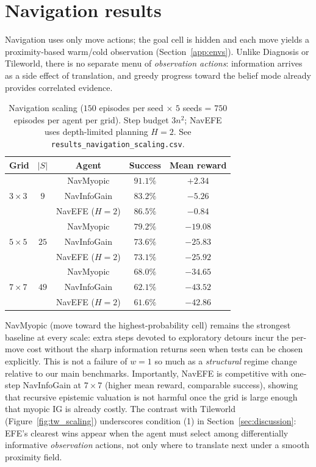 \documentclass[runningheads]{llncs}
\begin{document}
\section{Navigation results}
\label{app:navigation}

Navigation uses only move actions; the goal cell is hidden and each move yields a proximity-based warm/cold observation (Section~\ref{app:envs}). Unlike Diagnosis or Tileworld, there is no separate menu of \emph{observation actions}: information arrives as a side effect of translation, and greedy progress toward the belief mode already provides correlated evidence.

\begin{table}[h]
\centering
\caption{Navigation scaling ($150$ episodes per seed $\times$ $5$ seeds = $750$ episodes per agent per grid). Step budget $3n^2$; NavEFE uses depth-limited planning $H{=}2$. See \texttt{results\_navigation\_scaling.csv}.}
\label{tab:nav_scaling}
\begin{small}
\begin{tabular}{lcccc}
\toprule
Grid & $|S|$ & Agent & Success & Mean reward \\
\midrule
\multirow{3}{*}{$3{\times}3$} & \multirow{3}{*}{$9$} & NavMyopic & $91.1\%$ & $+2.34$ \\
& & NavInfoGain & $83.2\%$ & $-5.26$ \\
& & NavEFE ($H{=}2$) & $86.5\%$ & $-0.84$ \\
\midrule
\multirow{3}{*}{$5{\times}5$} & \multirow{3}{*}{$25$} & NavMyopic & $79.2\%$ & $-19.08$ \\
& & NavInfoGain & $73.6\%$ & $-25.83$ \\
& & NavEFE ($H{=}2$) & $73.1\%$ & $-25.92$ \\
\midrule
\multirow{3}{*}{$7{\times}7$} & \multirow{3}{*}{$49$} & NavMyopic & $68.0\%$ & $-34.65$ \\
& & NavInfoGain & $62.1\%$ & $-43.52$ \\
& & NavEFE ($H{=}2$) & $61.6\%$ & $-42.86$ \\
\bottomrule
\end{tabular}
\end{small}
\end{table}

NavMyopic (move toward the highest-probability cell) remains the strongest baseline at every scale: extra steps devoted to exploratory detours incur the per-move cost without the sharp information returns seen when tests can be chosen explicitly. This is not a failure of $w{=}1$ so much as a \emph{structural} regime change relative to our main benchmarks. Importantly, NavEFE is competitive with one-step NavInfoGain at $7{\times}7$ (higher mean reward, comparable success), showing that recursive epistemic valuation is not harmful once the grid is large enough that myopic IG is already costly. The contrast with Tileworld (Figure~\ref{fig:tw_scaling}) underscores condition (1) in Section~\ref{sec:discussion}: EFE's clearest wins appear when the agent must select among differentially informative \emph{observation} actions, not only where to translate next under a smooth proximity field.
\end{document}
